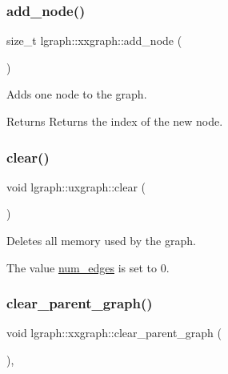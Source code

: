 \subsubsection{\texorpdfstring{add\+\_\+node()}{add\_node()}}
{\footnotesize\ttfamily size\+\_\+t lgraph\+::xxgraph\+::add\+\_\+node (\begin{DoxyParamCaption}{ }\end{DoxyParamCaption})\hspace{0.3cm}{\ttfamily [inherited]}}



Adds one node to the graph. 

\begin{DoxyReturn}{Returns}
Returns the index of the new node. 
\end{DoxyReturn}
\mbox{\label{classlgraph_1_1uxgraph_aad397c98fd1f144350e4418971319a97}} 
\subsubsection{\texorpdfstring{clear()}{clear()}}
{\footnotesize\ttfamily void lgraph\+::uxgraph\+::clear (\begin{DoxyParamCaption}{ }\end{DoxyParamCaption})}



Deletes all memory used by the graph. 

The value \hyperlink{classlgraph_1_1xxgraph_a6765a9a3be42f6e0f824635c593b35d7}{num\+\_\+edges} is set to 0. \mbox{\label{classlgraph_1_1xxgraph_a4122495066e4402cbf6d2d9bb82d54cc}} 
\subsubsection{\texorpdfstring{clear\+\_\+parent\+\_\+graph()}{clear\_parent\_graph()}}
{\footnotesize\ttfamily void lgraph\+::xxgraph\+::clear\+\_\+parent\+\_\+graph (\begin{DoxyParamCaption}{ }\end{DoxyParamCaption})\hspace{0.3cm}{\ttfamily [protected]}, {\ttfamily [inherited]}}



